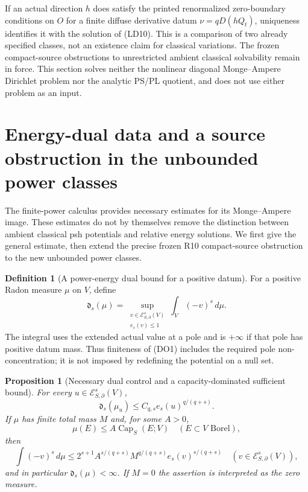 \documentclass[11pt,a4paper]{article}
\numberwithin{equation}{section}
\newtheorem{proposition}[theorem]{Proposition}
\theoremstyle{definition}
\newtheorem{definition}[theorem]{Definition}
\theoremstyle{remark}
\begin{document}
If an actual direction $h$ does satisfy the printed renormalized
zero-boundary conditions on $O$ for a finite diffuse derivative datum
$\nu=qD(hQ_t)$, uniqueness identifies it with the solution of
(LD10).  This is a comparison of two already specified classes, not
an existence claim for classical variations.  The frozen compact-source
obstructions to unrestricted ambient classical solvability remain in
force.  This section solves neither the nonlinear diagonal
Monge--Ampere Dirichlet problem nor the analytic PS/PL quotient, and
does not use either problem as an input.



\section{Energy-dual data and a source obstruction in the unbounded power classes}
\label{sec:r11-power-source-obstruction}

The finite-power calculus provides necessary estimates for its
Monge--Ampere image. These estimates do not by themselves remove
the distinction between ambient classical psh potentials and
relative energy solutions. We first give the general estimate,
then extend the precise frozen R10 compact-source obstruction to
the new unbounded power classes.

\begin{definition}[A power-energy dual bound for a positive datum]
\label{def:r11-power-dual-datum}
For a positive Radon measure $\mu$ on $V$, define
\[
 \mathfrak d_s(\mu)
   =\sup_{\substack{v\in\mathcal E^s_{S,\partial}(V)\\e_s(v)\leq1}}
                                  \int_V(-v)^s\,d\mu.
 \tag{DO1}
\]
The integral uses the extended actual value at a pole and is
$+\infty$ if that pole has positive datum mass. Thus finiteness
of (DO1) includes the required pole non-concentration; it is
not imposed by redefining the potential on a null set.
\end{definition}

\begin{proposition}[Necessary dual control and a capacity-dominated sufficient bound]
\label{prop:r11-power-dual-bound}
For every $u\in\mathcal E^s_{S,\partial}(V)$,
\[
                     \mathfrak d_s(\mu_u)
                               \leq C_{q,s}e_s(u)^{q/(q+s)}.
 \tag{DO2}
\]
If $\mu$ has finite total mass $M$ and, for some $A>0$,
\[
                     \mu(E)\leq A\operatorname{Cap}_S(E;V)
                             \quad(E\subset V\text{ Borel}),
 \tag{DO3}
\]
then
\[
 \int(-v)^s\,d\mu
    \leq2^{s+1}A^{s/(q+s)}M^{q/(q+s)}e_s(v)^{s/(q+s)}
           \quad(v\in\mathcal E^s_{S,\partial}(V)),
 \tag{DO4}
\]
and in particular $\mathfrak d_s(\mu)<\infty$.
If $M=0$ the assertion is interpreted as the zero measure.
\end{proposition}
\end{document}
